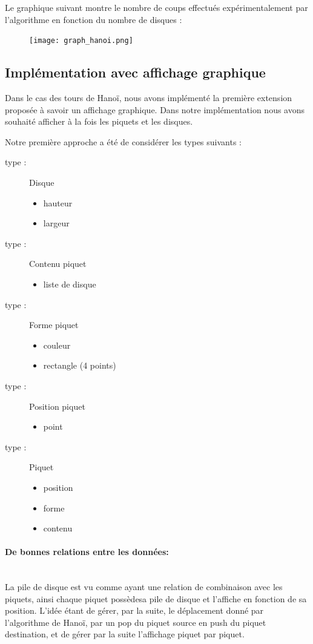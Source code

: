 \documentclass[a4paper,11pt]{article}
\begin{document}
Le graphique suivant montre le nombre de coups effectués expérimentalement par l'algorithme en fonction du nombre de disques :
\begin{figure}[h]
  \texttt{[image: graph\_hanoi.png]}
  \label{fig:graph_hanoi}
\end{figure}

\subsection{Implémentation avec affichage graphique}
Dans le cas des tours de Hanoï, nous avons implémenté la première extension proposée à savoir un affichage graphique.
Dans notre implémentation nous avons souhaité afficher à la fois les piquets et les disques.

Notre première approche a été de considérer les types suivants :
\begin{multicols}{3}
\begin{description}
\item[type :] Disque 
	\begin{itemize}
	\item hauteur
	\item largeur 
	\end{itemize}
\item[type :] Contenu piquet
	\begin{itemize}
	\item liste de disque
	\end{itemize}
\item[type :] Forme piquet
	\begin{itemize}
	\item couleur
	\item rectangle (4 points) 
	\end{itemize}
\item[type :]Position piquet
	\begin{itemize}
	\item point 
	\end{itemize}
\item [type :] Piquet 
	\begin{itemize}
	\item position
	\item forme
	\item contenu 
	\end{itemize}
\end{description}
\end{multicols}
\paragraph{De bonnes relations entre les données:}\mbox{}\\
La pile de disque est vu comme ayant une relation de combinaison avec les piquets, ainsi chaque piquet \og possède\fg sa pile de disque et l'affiche en fonction de sa position.
L'idée étant de gérer, par la suite, le déplacement donné par l'algorithme de Hanoï, par un pop du piquet source en push du piquet destination, et de gérer par la suite l'affichage piquet par piquet. 
\end{document}
